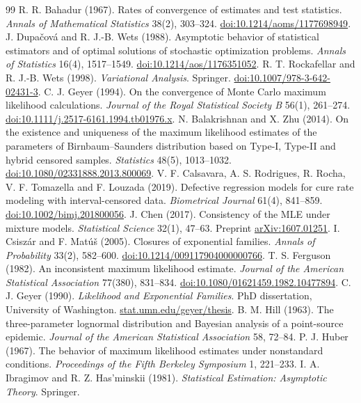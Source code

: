\documentclass[11pt]{article}
\newcommand{\doi}[1]{\href{https://doi.org/#1}{doi:#1}}
\theoremstyle{definition}
\theoremstyle{remark}
\begin{document}
\begin{thebibliography}{99}
 R. R. Bahadur (1967). Rates of convergence of estimates
and test statistics. \emph{Annals of Mathematical Statistics} 38(2),
303--324. \doi{10.1214/aoms/1177698949}.
 J. Dupa\v cov\'a and R. J.-B. Wets (1988). Asymptotic behavior
of statistical estimators and of optimal solutions of stochastic
optimization problems. \emph{Annals of Statistics} 16(4), 1517--1549.
\doi{10.1214/aos/1176351052}.
 R. T. Rockafellar and R. J.-B. Wets (1998). \emph{Variational
Analysis}. Springer. \doi{10.1007/978-3-642-02431-3}.
 C. J. Geyer (1994). On the convergence of Monte Carlo
maximum likelihood calculations. \emph{Journal of the Royal Statistical
Society B} 56(1), 261--274. \doi{10.1111/j.2517-6161.1994.tb01976.x}.
 N. Balakrishnan and X. Zhu (2014). On the existence and
uniqueness of the maximum likelihood estimates of the parameters of
Birnbaum--Saunders distribution based on Type-I, Type-II and hybrid
censored samples. \emph{Statistics} 48(5), 1013--1032.
\doi{10.1080/02331888.2013.800069}.
 V. F. Calsavara, A. S. Rodrigues, R. Rocha,
V. F. Tomazella and F. Louzada (2019). Defective regression models for cure
rate modeling with interval-censored data. \emph{Biometrical Journal}
61(4), 841--859. \doi{10.1002/bimj.201800056}.
 J. Chen (2017). Consistency of the MLE under mixture models.
\emph{Statistical Science} 32(1), 47--63. Preprint
\href{https://arxiv.org/abs/1607.01251}{arXiv:1607.01251}.
 I. Csisz\'ar and F. Mat\'u\v s (2005). Closures of exponential
families. \emph{Annals of Probability} 33(2), 582--600.
\doi{10.1214/009117904000000766}.
 T. S. Ferguson (1982). An inconsistent maximum likelihood
estimate. \emph{Journal of the American Statistical Association} 77(380),
831--834. \doi{10.1080/01621459.1982.10477894}.
 C. J. Geyer (1990). \emph{Likelihood and Exponential
Families}. PhD dissertation, University of Washington.
\href{https://www.stat.umn.edu/geyer/thesis/}{stat.umn.edu/geyer/thesis}.
 B. M. Hill (1963). The three-parameter lognormal
distribution and Bayesian analysis of a point-source epidemic.
\emph{Journal of the American Statistical Association} 58, 72--84.
 P. J. Huber (1967). The behavior of maximum likelihood
estimates under nonstandard conditions. \emph{Proceedings of the Fifth
Berkeley Symposium} 1, 221--233.
 I. A. Ibragimov and R. Z. Has'minskii (1981).
\emph{Statistical Estimation: Asymptotic Theory}. Springer.

\end{thebibliography}
\end{document}
